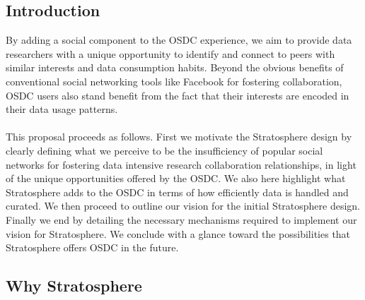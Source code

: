\tableofcontents
\newpage
\begin{multicols*}{2}

\section{Introduction}
\label{sec:intro}

By adding a social component to the OSDC experience, we aim to provide
data researchers with a unique opportunity to identify and connect to
peers with similar interests and data consumption habits. Beyond the
obvious benefits of conventional social networking tools like Facebook
for fostering collaboration, OSDC users also stand benefit from the
fact that their interests are encoded in their data usage patterns.
\\
\\
This proposal proceeds as follows. First we motivate
the Stratosphere design by clearly defining what we perceive to be the
insufficiency of popular social networks for fostering data intensive
research collaboration relationships, in light of the unique
opportunities offered by the OSDC. We also here highlight what
Stratosphere adds to the OSDC in terms of how efficiently data is handled
and curated. We then proceed to outline our
vision for the initial Stratosphere design. Finally we end by
detailing the necessary mechanisms required to implement our
vision for Stratosphere. We conclude with a glance toward the
possibilities that Stratosphere offers OSDC in the future. 

\subsection{Why Stratosphere}
\label{sec:why}


\end{multicols*}
